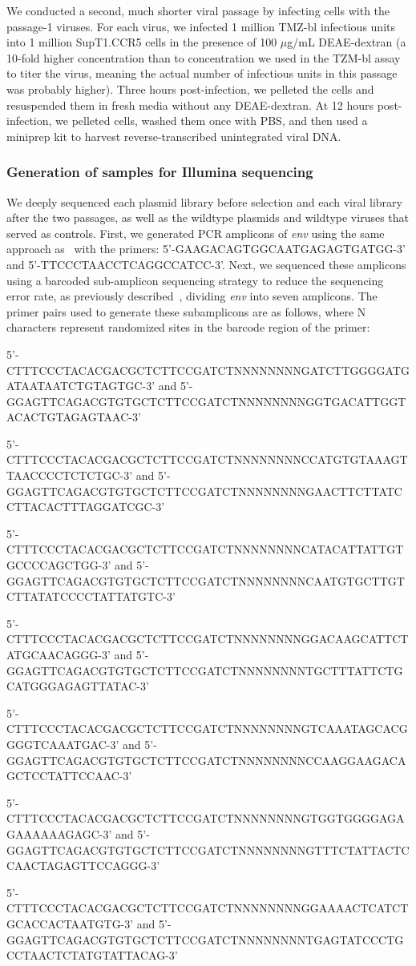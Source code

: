 \documentclass[9pt,lineno]{elife}
\begin{document}
We conducted a second, much shorter viral passage by infecting cells with the passage-1 viruses.
For each virus, we infected 1 million TMZ-bl infectious units into 1 million SupT1.CCR5 cells in the presence of 100 $\mu$g/mL DEAE-dextran (a 10-fold higher concentration than to concentration we used in the TZM-bl assay to titer the virus, meaning the actual number of infectious units in this passage was probably higher).
Three hours post-infection, we pelleted the cells and resuspended them in fresh media without any DEAE-dextran.
At 12 hours post-infection, we pelleted cells, washed them once with PBS, and then used a miniprep kit to harvest reverse-transcribed unintegrated viral DNA.

\subsubsection*{Generation of samples for Illumina sequencing}
We deeply sequenced each plasmid library before selection and each viral library after the two passages, as well as the wildtype plasmids and wildtype viruses that served as controls.
First, we generated PCR amplicons of \textit{env} using the same approach as~\cite{dingens2017comprehensive} with the primers: 5'-GAAGACAGTGGCAATGAGAGTGATGG-3' and 5'-TTCCCTAACCTCAGGCCATCC-3'.
Next, we sequenced these amplicons using a barcoded sub-amplicon sequencing strategy to reduce the sequencing error rate, as previously described~\cite{doud2016accurate,haddox2016experimental}, dividing \textit{env} into seven amplicons.
The primer pairs used to generate these subamplicons are as follows, where N characters represent randomized sites in the barcode region of the primer:

\begin{itemize}
{\footnotesize
\item 5'-CTTTCCCTACACGACGCTCTTCCGATCTNNNNNNNNGATCTTGGGGATGATAATAATCTGTAGTGC-3' and 5'-GGAGTTCAGACGTGTGCTCTTCCGATCTNNNNNNNNGGTGACATTGGTACACTGTAGAGTAAC-3'
\item 5'-CTTTCCCTACACGACGCTCTTCCGATCTNNNNNNNNCCATGTGTAAAGTTAACCCCTCTCTGC-3' and 5'-GGAGTTCAGACGTGTGCTCTTCCGATCTNNNNNNNNGAACTTCTTATCCTTACACTTTAGGATCGC-3'
\item 5'-CTTTCCCTACACGACGCTCTTCCGATCTNNNNNNNNCATACATTATTGTGCCCCAGCTGG-3' and 5'-GGAGTTCAGACGTGTGCTCTTCCGATCTNNNNNNNNCAATGTGCTTGTCTTATATCCCCTATTATGTC-3'
\item 5'-CTTTCCCTACACGACGCTCTTCCGATCTNNNNNNNNGGACAAGCATTCTATGCAACAGGG-3' and 5'-GGAGTTCAGACGTGTGCTCTTCCGATCTNNNNNNNNTGCTTTATTCTGCATGGGAGAGTTATAC-3'
\item 5'-CTTTCCCTACACGACGCTCTTCCGATCTNNNNNNNNGTCAAATAGCACGGGGTCAAATGAC-3' and 5'-GGAGTTCAGACGTGTGCTCTTCCGATCTNNNNNNNNCCAAGGAAGACAGCTCCTATTCCAAC-3'
\item 5'-CTTTCCCTACACGACGCTCTTCCGATCTNNNNNNNNGTGGTGGGGAGAGAAAAAAGAGC-3' and 5'-GGAGTTCAGACGTGTGCTCTTCCGATCTNNNNNNNNGTTTCTATTACTCCAACTAGAGTTCCAGGG-3'
\item 5'-CTTTCCCTACACGACGCTCTTCCGATCTNNNNNNNNGGAAAACTCATCTGCACCACTAATGTG-3' and 5'-GGAGTTCAGACGTGTGCTCTTCCGATCTNNNNNNNNTGAGTATCCCTGCCTAACTCTATGTATTACAG-3'
}
\end{itemize}
\end{document}
